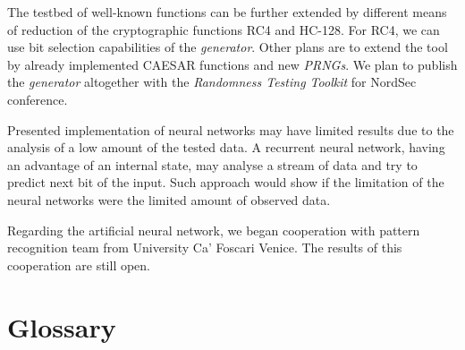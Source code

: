 \documentclass[
    digital,    %
    oneside,    %
    color,
    11pt,
    nocover,
    notable,
    nolof,
    nolot,
]{fithesis3}
\begin{document}
The testbed of well-known functions can be further extended by different means of reduction of the cryptographic functions RC4 and HC-128. For RC4, we can use bit selection capabilities of the \textit{generator}. Other plans are to extend the tool by already implemented CAESAR functions and new \textit{PRNGs}. We plan to publish the \textit{generator} altogether with the \textit{Randomness Testing Toolkit} for NordSec conference.

Presented implementation of neural networks may have limited results due to the analysis of a low amount of the tested data. A recurrent neural network, having an advantage of an internal state, may analyse a stream of data and try to predict next bit of the input. Such approach would show if the limitation of the neural networks were the limited amount of observed data.

Regarding the artificial neural network, we began cooperation with pattern recognition team from University Ca’ Foscari Venice. The results of this cooperation are still open.



\printbibliography[heading=bibintoc] %

\appendix{}

\chapter{Glossary}
\label{chap:app-glos}
\end{document}
